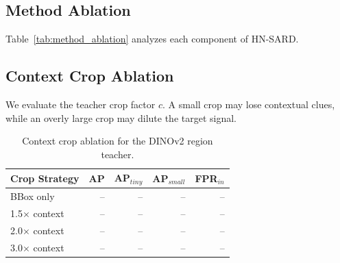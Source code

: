 \documentclass[conference,a4paper]{IEEEtran}
\begin{document}
\subsection{Method Ablation}

Table~\ref{tab:method_ablation} analyzes each component of HN-SARD.

\begin{table}[!htbp]
\centering
\caption{Method ablation. $\mathcal{L}_{pos}$ targets region-level alignment, scale-aware weighting emphasizes small objects, and $\mathcal{L}_{con}$ reduces hard-negative false positives.}
\label{tab:method_ablation}
\end{table}
\FloatBarrier

\subsection{Context Crop Ablation}

We evaluate the teacher crop factor $c$.
A small crop may lose contextual clues, while an overly large crop may dilute the target signal.

\begin{table}[!htbp]
\centering
\caption{Context crop ablation for the DINOv2 region teacher.}
\label{tab:crop_ablation}
\begin{tabular}{lrrrr}
\toprule
Crop Strategy & AP & AP$_{tiny}$ & AP$_{small}$ & FPR$_{in}$ \\
\midrule
BBox only & -- & -- & -- & -- \\
1.5$\times$ context & -- & -- & -- & -- \\
2.0$\times$ context & -- & -- & -- & -- \\
3.0$\times$ context & -- & -- & -- & -- \\
\bottomrule
\end{tabular}
\end{table}
\FloatBarrier
\end{document}
